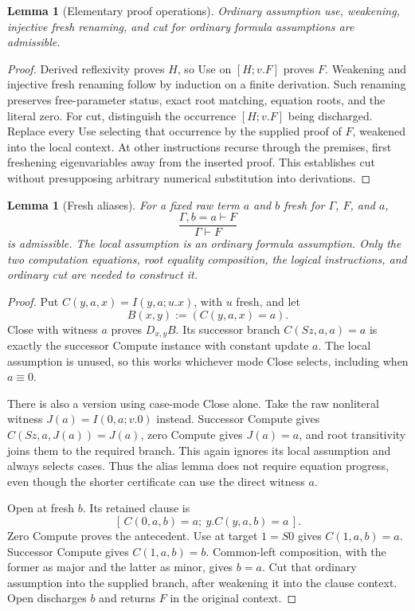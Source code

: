 \documentclass[11pt,letterpaper]{article}
\newtheorem{lemma}[theorem]{Lemma}
\begin{document}
\begin{lemma}[Elementary proof operations]
Ordinary assumption use, weakening, injective fresh renaming, and cut
for ordinary formula assumptions are admissible.
\end{lemma}
\begin{proof}
Derived reflexivity proves $H$, so Use on $[H;v.F]$ proves $F$.
Weakening and injective fresh renaming follow by induction on a finite
derivation.  Such renaming preserves free-parameter status, exact root
matching, equation roots, and the literal zero.  For cut, distinguish the
occurrence $[H;v.F]$ being discharged.  Replace every Use selecting that
occurrence by the supplied proof of $F$, weakened into the local context.
At other instructions recurse through the premises, first freshening
eigenvariables away from the inserted proof.  This establishes cut
without presupposing arbitrary numerical substitution into derivations.
\end{proof}

\begin{lemma}[Fresh aliases]
\label{lem:rp-alias}
For a fixed raw term $a$ and $b$ fresh for $\Gamma$, $F$, and $a$,
\[
 \frac{\Gamma,b=a\vdash F}{\Gamma\vdash F}
 \tag{Alias}
\]
is admissible.  The local assumption is an ordinary formula assumption.
Only the two computation equations, root equality composition, the
logical instructions, and ordinary cut are needed to construct it.
\end{lemma}
\begin{proof}
Put $C(y,a,x)=I(y,a;u.x)$, with $u$ fresh, and let
\[
 B(x,y):=(C(y,a,x)=a).
\]
Close with witness $a$ proves $D_{x,y}B$.  Its successor branch
$C(Sz,a,a)=a$ is exactly the successor Compute instance with constant
update $a$.  The local assumption is unused, so this works whichever
mode Close selects, including when $a\equiv0$.

There is also a version using case-mode Close alone.  Take the raw
nonliteral witness $J(a)=I(0,a;v.0)$ instead.  Successor Compute gives
$C(Sz,a,J(a))=J(a)$, zero Compute gives $J(a)=a$, and root transitivity
joins them to the required branch.  This again ignores its local
assumption and always selects cases.  Thus the alias lemma does not
require equation progress, even though the shorter certificate can
use the direct witness $a$.

Open at fresh $b$.  Its retained clause is
\[
 [\,C(0,a,b)=a;\ y.C(y,a,b)=a\,].
\]
Zero Compute proves the antecedent.  Use at target $1=S0$ gives
$C(1,a,b)=a$.  Successor Compute gives $C(1,a,b)=b$.
Common-left composition, with the former as major and the latter as
minor, gives $b=a$.  Cut that ordinary assumption into the supplied
branch, after weakening it into the clause context.  Open discharges
$b$ and returns $F$ in the original context.
\end{proof}
\end{document}
